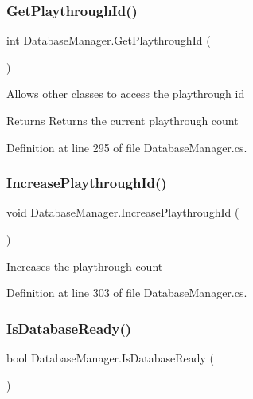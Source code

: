 \subsubsection{\texorpdfstring{Get\+Playthrough\+Id()}{GetPlaythroughId()}}
{\footnotesize\ttfamily int Database\+Manager.\+Get\+Playthrough\+Id (\begin{DoxyParamCaption}{ }\end{DoxyParamCaption})}



Allows other classes to access the playthrough id 

\begin{DoxyReturn}{Returns}
Returns the current playthrough count
\end{DoxyReturn}


Definition at line 295 of file Database\+Manager.\+cs.

\mbox{\label{class_database_manager_a8215a2e17e479aa9c2f76bdf1a18a018}} 
\subsubsection{\texorpdfstring{Increase\+Playthrough\+Id()}{IncreasePlaythroughId()}}
{\footnotesize\ttfamily void Database\+Manager.\+Increase\+Playthrough\+Id (\begin{DoxyParamCaption}{ }\end{DoxyParamCaption})}



Increases the playthrough count 



Definition at line 303 of file Database\+Manager.\+cs.

\mbox{\label{class_database_manager_ad0baa3bf8e05288ba738646770672b34}} 
\subsubsection{\texorpdfstring{Is\+Database\+Ready()}{IsDatabaseReady()}}
{\footnotesize\ttfamily bool Database\+Manager.\+Is\+Database\+Ready (\begin{DoxyParamCaption}{ }\end{DoxyParamCaption})}



